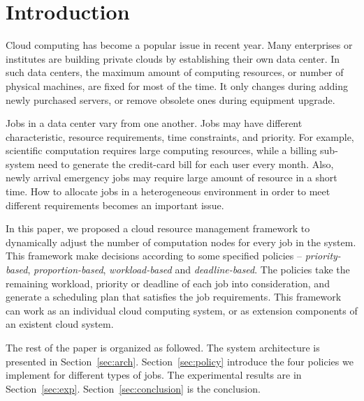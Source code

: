 \section{Introduction}\label{sec:intro}

Cloud computing has become a popular issue in recent year.
Many enterprises or institutes are building private clouds by 
establishing their own data center.
In such data centers, the maximum amount of computing resources, or 
number of physical machines, are fixed for most of the time.
It only changes during adding newly purchased servers, or remove 
obsolete ones during equipment upgrade.


Jobs in a data center vary from one another.
Jobs may have different characteristic, resource requirements, time 
constraints, and priority.
For example, scientific computation requires large computing resources,
while a billing sub-system need to generate the credit-card bill for 
each user every month.
Also, newly arrival emergency jobs may require large amount of resource
in a short time.
How to allocate jobs in a heterogeneous environment in order to meet 
different requirements becomes an important issue.

In this paper, we proposed a cloud resource management framework to 
dynamically adjust the number of computation nodes for every job in the
system.
This framework make decisions according to some specified policies --
\emph{priority-based}, \emph{proportion-based}, \emph{workload-based}
and \emph{deadline-based}.
The policies take the remaining workload, priority or deadline of each
job into consideration, and generate a scheduling plan that satisfies 
the job requirements.
This framework can work as an individual cloud computing system, or as
extension components of an existent cloud system.

The rest of the paper is organized as followed.
The system architecture is presented in Section~\ref{sec:arch}.
Section~\ref{sec:policy} introduce the four policies we implement for 
different types of jobs.
The experimental results are in Section~\ref{sec:exp}.
Section~\ref{sec:conclusion} is the conclusion.
